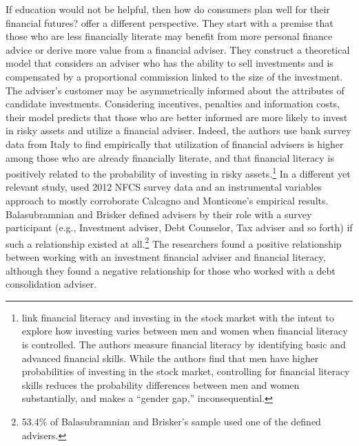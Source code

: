 \documentclass[12pt]{article}
\theoremstyle{plain}
\begin{document}
If education would not be helpful, then how do consumers plan well for their financial futures?  \cite{calcagno2015financial} offer a different perspective.  They start with a premise that those who are less financially literate may benefit from more personal finance advice or derive more value from a financial adviser.  They construct a theoretical model that considers an adviser who has the ability to sell investments and is compensated by a proportional commission linked to the size of the investment. The adviser's customer may be asymmetrically informed about the attributes of candidate investments.  Considering incentives, penalties and information costs, their model predicts that those who are better informed are more likely to invest in risky assets and utilize a financial adviser.  Indeed, the authors use bank survey data from Italy to find empirically that utilization of financial advisers is higher among those who are already financially literate, and that financial literacy is positively related to the probability of investing in risky assets.\footnote{\cite{almenberg2015gender} link financial literacy and investing in the stock market with the intent to explore how investing varies between men and women when financial literacy is controlled.  The authors measure financial literacy by identifying basic and advanced financial skills.  While the authors find that men have higher probabilities of investing in the stock market, controlling for financial literacy skills reduces the probability differences between men and women substantially, and makes a ``gender gap,'' inconsequential.}   In a different yet relevant study, \cite{advisorsBandB2016} used 2012 NFCS survey data and an instrumental variables approach to mostly corroborate Calcagno and Monticone's empirical results.  Balasubramnian and Brisker defined advisers by their role with a survey participant (e.g., Investment adviser, Debt Counselor, Tax adviser and so forth) if such a relationship existed at all.\footnote{53.4\% of Balasubramnian and Brisker's sample used one of the defined advisers.}   The researchers found  a positive relationship between working with an investment financial adviser and financial literacy, although they found a negative relationship for those who worked with a debt consolidation adviser. 
\end{document}
